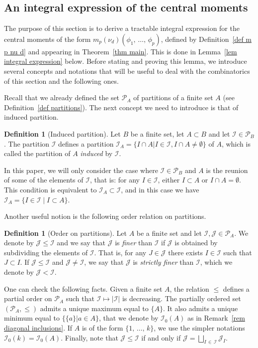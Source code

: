 \documentclass[10pt]{amsart}
\theoremstyle{definition}\newtheorem{defi}[theo]{Definition}\newtheorem{rema}[theo]{Remark}\newtheorem{exam}[theo]{Example}\newtheorem{exem}[theo]{Example}\newtheorem{nota}[theo]{Notation}
\newcommand{\I}{\mathcal{I}}
\newcommand{\J}{\mathcal{J}}
\newcommand{\pa}{\mathcal{P}\!}
\renewcommand{\leq}{\leqslant}
\begin{document}
\subsection{An integral expression of the central moments}\label{subsec an integral expression of the central moments}

The purpose of this section is to derive a tractable integral expression for the central moments of the form $m_p(\nu_d)(\phi_1,\,\dots,\,\phi_p)$, defined by Definition~\ref{def m p nu d} and appearing in Theorem~\ref{thm main}. This is done in Lemma~\ref{lem integral expression} below. Before stating and proving this lemma, we introduce several concepts and notations that will be useful to deal with the combinatorics of this section and the following ones.

Recall that we already defined the set $\pa_A$ of partitions of a finite set $A$ (see Definition~\ref{def partitions}). The next concept we need to introduce is that of induced partition.

\begin{defi}[{Induced partition}]\label{def induced partition}
Let $B$ be a finite set, let $A \subset B$ and let $\I \in \pa_B$. The partition $\I$ defines a partition $\I_A = \{ I \cap A \vert I \in \I, I \cap A \neq \emptyset \}$ of $A$, which is called the partition of $A$ \emph{induced} by $\I$.
\end{defi}

In this paper, we will only consider the case where $\I \in \pa_B$ and $A$ is the reunion of some of the elements of $\I$, that is: for any $I \in \I$, either $I \subset A$ or $I \cap A = \emptyset$. This condition is equivalent to $\I_A \subset \I$, and in this case we have $\I_A = \{I \in \I \mid I \subset A\}$.

Another useful notion is the following order relation on partitions.

\begin{defi}[{Order on partitions}]\label{def order on partitions}
Let $A$ be a finite set and let $\I,\J \in \pa_A$. We denote by $\J \leq \I$ and we say that $\J$ is \emph{finer} than $\I$ if $\J$ is obtained by subdividing the elements of $\I$. That is, for any $J \in \J$ there exists $I \in \I$ such that $J \subset I$. If $\J \leq \I$ and $\J \neq \I$, we say that $\J$ is \emph{strictly finer} than $\I$, which we denote by $\J < \I$.
\end{defi}

One can check the following facts. Given a finite set $A$, the relation $\leq$ defines a partial order on $\pa_A$ such that $\I \mapsto |\I|$ is decreasing. The partially ordered set $(\pa_A,\leq )$ admits a unique maximum equal to $\{A\}$. It also admits a unique minimum equal to $\{ \{a\} \vert a \in A \}$, that we denote by $\I_0(A)$ as in Remark~\ref{rem diagonal inclusions}. If $A$ is of the form $\{1,\,\dots,\,k\}$, we use the simpler notations $\I_0(k)=\I_0(A)$. Finally, note that $\J \leq \I$ if and only if $\J = \bigsqcup_{I\,\in\,\I} \J_I$.
\end{document}
